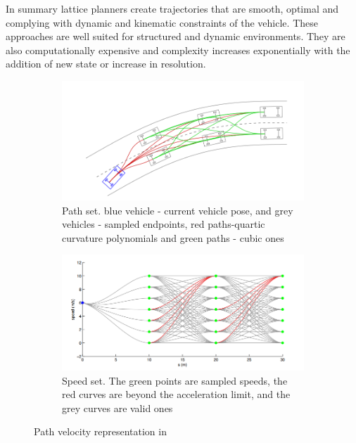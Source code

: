 In summary lattice planners create trajectories that are smooth, optimal and complying with dynamic and kinematic constraints of the vehicle. These approaches are well suited for structured and dynamic environments. They are also computationally expensive and complexity increases exponentially with the addition of new state or increase in resolution.

\begin{figure}
	\centering
	\begin{subfigure}{.52\textwidth}
		\centering
		\includegraphics[width=1.0\linewidth]{Images/related_work/traj_optim_1.png}
		\caption{Path set. blue vehicle - current vehicle pose, and grey vehicles - sampled endpoints, red paths-quartic curvature polynomials and green paths - cubic ones}
		\label{trajoptsub1}
	\end{subfigure}%
	\begin{subfigure}{.48\textwidth}
		\centering
		\includegraphics[width=1.0\linewidth]{Images/related_work/traj_optim_2.png}
		\caption{Speed set. The green points are sampled speeds, the
red curves are beyond the acceleration limit, and the grey
curves are valid ones}
		\label{trajoptsub2}
	\end{subfigure}
	\caption{Path velocity representation in \cite{traj_planner_optimization}}
	\label{trajopt}
\end{figure}

